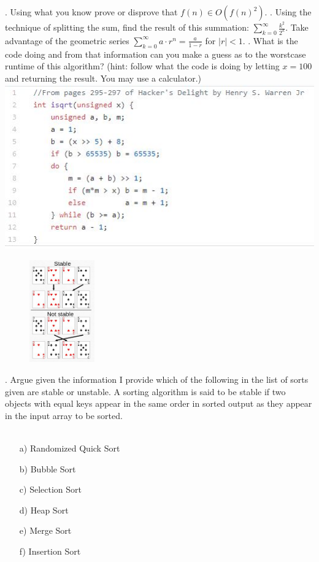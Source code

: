 \documentclass[12pt]{article}
\begin{document}
\newpage
{}. Using what you know prove or disprove that $f(n)\in O(f(n)^2)$.
\newpage
{}. Using the technique of splitting the sum, find the result of this summation: $\sum\limits_{k=0}^{\infty}{\frac{k^2}{2^k}}$. Take advantage of the geometric series $\sum\limits_{k=0}^{\infty}{a \cdot r^n} = \frac{a}{1-r}$ for $|r| < 1$.
\newpage
{}. What is the code doing and from that information can you make a guess as to the worstcase runtime of this algorithm? (hint: follow what the code is doing by letting $x = 100$ and returning the result. You may use a calculator.)\\
\includegraphics[width=\linewidth]{isqrt.jpg} 
\newpage
\begin{figure}
    \centering
    \includegraphics[width=0.25\textwidth]{ssort.jpg}
\end{figure}
. Argue given the information I provide which of the following in the list of sorts given are stable or unstable. A sorting algorithm is said to be stable if two objects with equal keys appear in the same order in sorted output as they appear in the input array to be sorted.\\\\
\begin{enumerate}
    \item[a)]Randomized Quick Sort
    \item[b)]Bubble Sort
    \item[c)]Selection Sort
    \item[d)]Heap Sort
    \item[e)]Merge Sort
    \item[f)]Insertion Sort
\end{enumerate}
\end{document}
